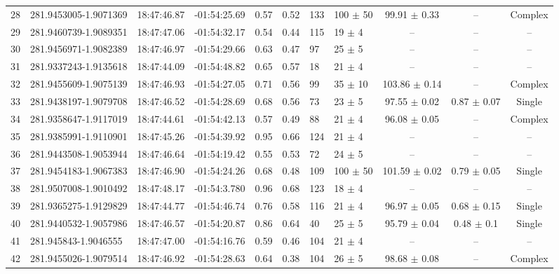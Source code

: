 \begin{table}[htbp!]
\begin{tabular}{llllllllccc}
28  &  281.9453005-1.9071369  &  18:47:46.87  &  -01:54:25.69  &  0.57  &  0.52  &  133  &  100 $\pm$ 50  &  99.91 $\pm$ 0.33  &  --  &  Complex \\
29  &  281.9460739-1.9089351  &  18:47:47.06  &  -01:54:32.17  &  0.54  &  0.44  &  115  &  19 $\pm$ 4  &  --  &  --  &  -- \\
30  &  281.9456971-1.9082389  &  18:47:46.97  &  -01:54:29.66  &  0.63  &  0.47  &  97  &  25 $\pm$ 5  &  --  &  --  &  -- \\
31  &  281.9337243-1.9135618  &  18:47:44.09  &  -01:54:48.82  &  0.65  &  0.57  &  18  &  21 $\pm$ 4  &  --  &  --  &  -- \\
32  &  281.9455609-1.9075139  &  18:47:46.93  &  -01:54:27.05  &  0.71  &  0.56  &  99  &  35 $\pm$ 10  &  103.86 $\pm$ 0.14  &  --  &  Complex \\
33  &  281.9438197-1.9079708  &  18:47:46.52  &  -01:54:28.69  &  0.68  &  0.56  &  73  &  23 $\pm$ 5  &  97.55 $\pm$ 0.02  &  0.87 $\pm$ 0.07  &  Single \\
34  &  281.9358647-1.9117019  &  18:47:44.61  &  -01:54:42.13  &  0.57  &  0.49  &  88  &  21 $\pm$ 4  &  96.08 $\pm$ 0.05  &  --  &  Complex \\
35  &  281.9385991-1.9110901  &  18:47:45.26  &  -01:54:39.92  &  0.95  &  0.66  &  124  &  21 $\pm$ 4  &  --  &  --  &  -- \\
36  &  281.9443508-1.9053944  &  18:47:46.64  &  -01:54:19.42  &  0.55  &  0.53  &  72  &  24 $\pm$ 5  &  --  &  --  &  -- \\
37  &  281.9454183-1.9067383  &  18:47:46.90  &  -01:54:24.26  &  0.68  &  0.48  &  109  &  100 $\pm$ 50  &  101.59 $\pm$ 0.02  &  0.79 $\pm$ 0.05  &  Single \\
38  &  281.9507008-1.9010492  &  18:47:48.17  &  -01:54:3.780  &  0.96  &  0.68  &  123  &  18 $\pm$ 4  &  --  &  --  &  -- \\
39  &  281.9365275-1.9129829  &  18:47:44.77  &  -01:54:46.74  &  0.76  &  0.58  &  116  &  21 $\pm$ 4  &  96.97 $\pm$ 0.05  &  0.68 $\pm$ 0.15  &  Single \\
40  &  281.9440532-1.9057986  &  18:47:46.57  &  -01:54:20.87  &  0.86  &  0.64  &  40  &  25 $\pm$ 5  &  95.79 $\pm$ 0.04  &  0.48 $\pm$ 0.1  &  Single \\
41  &  281.945843-1.9046555  &  18:47:47.00  &  -01:54:16.76  &  0.59  &  0.46  &  104  &  21 $\pm$ 4  &  --  &  --  &  -- \\
42  &  281.9455026-1.9079514  &  18:47:46.92  &  -01:54:28.63  &  0.64  &  0.38  &  104  &  26 $\pm$ 5  &  98.68 $\pm$ 0.08  &  --  &  Complex \\

\end{tabular}
\end{table}
